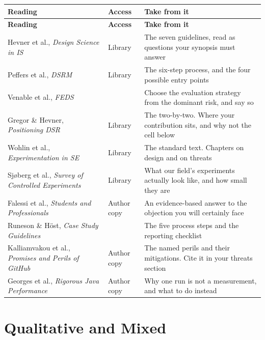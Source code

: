 \begin{center}
\small
\begin{longtable}{@{}L{4.4cm}L{1.8cm}L{7.6cm}@{}}
\toprule
\textbf{Reading} & \textbf{Access} & \textbf{Take from it} \\
\midrule
\endfirsthead
\toprule
\textbf{Reading} & \textbf{Access} & \textbf{Take from it} \\
\midrule
\endhead
\bottomrule
\endfoot
Hevner et al., \emph{Design Science in IS}~\cite{hevner2004design}
  & Library
  & The seven guidelines, read as questions your synopsis must answer \\
Peffers et al., \emph{DSRM}~\cite{peffers2007design}
  & Library
  & The six-step process, and the four possible entry points \\
Venable et al., \emph{FEDS}~\cite{venable2016feds}
  & \oa{}
  & Choose the evaluation strategy from the dominant risk, and say so \\
Gregor \& Hevner, \emph{Positioning DSR}~\cite{gregor2013positioning}
  & Library
  & The two-by-two. Where your contribution sits, and why not the cell below \\
Wohlin et al., \emph{Experimentation in SE}~\cite{wohlin2012experimentation}
  & Library
  & The standard text. Chapters on design and on threats \\
Sj{\o}berg et al., \emph{Survey of Controlled Experiments}~\cite{sjoberg2005survey}
  & Library
  & What our field's experiments actually look like, and how small they are \\
Falessi et al., \emph{Students and Professionals}~\cite{falessi2018empirical}
  & Author copy
  & An evidence-based answer to the objection you will certainly face \\
Runeson \& H{\"o}st, \emph{Case Study Guidelines}~\cite{runeson2009guidelines}
  & \oa{}
  & The five process steps and the reporting checklist \\
Kalliamvakou et al., \emph{Promises and Perils of GitHub}~\cite{kalliamvakou2014promises}
  & Author copy
  & The named perils and their mitigations. Cite it in your threats section \\
Georges et al., \emph{Rigorous Java Performance}~\cite{georges2007statistically}
  & Author copy
  & Why one run is not a measurement, and what to do instead \\
\end{longtable}
\end{center}

\section{Qualitative and Mixed}

